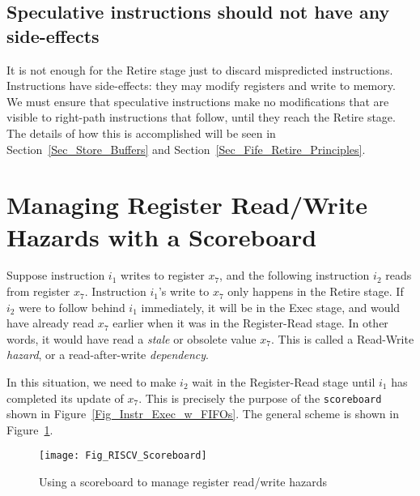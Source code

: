 
\subsection{Speculative instructions should not have any side-effects}

It is not enough for the Retire stage just to discard mispredicted
instructions.  Instructions have side-effects: they may modify
registers and write to memory.  We must ensure that speculative
instructions make no modifications that are visible to right-path
instructions that follow, until they reach the Retire stage.  The
details of how this is accomplished will be seen in
Section~\ref{Sec_Store_Buffers} and Section~\ref{Sec_Fife_Retire_Principles}.


\section{Managing Register Read/Write Hazards with a Scoreboard}

\label{Sec_Scoreboards}


Suppose instruction $i_1$ writes to register $x_7$, and the following
instruction $i_2$ reads from register $x_7$.  Instruction $i_1$'s
write to $x_7$ only happens in the Retire stage.  If $i_2$ were to
follow behind $i_1$ immediately, it will be in the Exec stage, and
would have already read $x_7$ earlier when it was in the Register-Read
stage.  In other words, it would have read a \emph{stale} or obsolete
value $x_7$.  This is called a Read-Write \emph{hazard}, or a
read-after-write \emph{dependency}.

In this situation, we need to make $i_2$ wait in the Register-Read
stage until $i_1$ has completed its update of $x_7$.  This is
precisely the purpose of the \verb|scoreboard| shown in
Figure~\ref{Fig_Instr_Exec_w_FIFOs}.  The general scheme is shown in
Figure~\ref{Fig_RISCV_Scoreboard}.
\begin{figure}[htbp]
  \centerline{\texttt{[image: Fig\_RISCV\_Scoreboard]}}
  \caption{\label{Fig_RISCV_Scoreboard}
           Using a scoreboard to manage register read/write hazards}
\end{figure}

